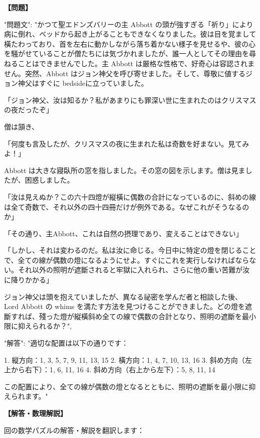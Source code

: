 \documentclass[10pt,a4paper,oneside,openany]{ltjsbook}
\begin{document}
\begin{tcolorbox}[colback=softblue,colframe=primaryblue,title=\textbf{第 292 問：THE ABBOT'S WINDOW.},arc=2mm,boxrule=1pt,breakable]
\textbf{【問題】}\par\vspace{0.3em}
{
  "問題文": "かつて聖エドンズバリーの主 Abbott の頭が強すぎる「祈り」により病に倒れ、ベッドから起き上がることもできなくなりました。彼は目を覚まして橫たわっており、首を左右に動かしながら落ち着かない様子を見せるや、彼の心を騒がせていることが僧たちには気づかれましたが、誰一人としてその理由を尋ねることはできませんでした。主 Abbott は厳格な性格で、好奇心は容認されません。突然、Abbott はジョン神父を呼び寄せました。そして、尊敬に値するジョン神父はすぐに bedsideに立っていました。

「ジョン神父、汝は知るか？私があまりにも罪深い世に生まれたのはクリスマスの夜だったぞ」

僧は頷き、

「何度も言及したが、クリスマスの夜に生まれた私は奇数を好まない。見てみよ！」

Abbott は大きな寢臥所の窓を指しました。その窓の図を示します。僧は見ましたが、困惑しました。

「汝は見えぬか？この六十四燈が縦橫に偶数の合計になっているのに、斜めの線は全て奇数で、それ以外の四十四冊だけが例外である。なぜこれがそうなるのか」

「その通り、主Abbott、これは自然の摂理であり、変えることはできない」

「しかし、それは変わるのだ。私は汝に命じる。今日中に特定の燈を閉じることで、全ての線が偶数の燈になるようにせよ。すぐにこれを実行しなければならない。それ以外の照明が遮斷されると牢獄に入れられ、さらに他の重い苦難が汝に降りかかる」

ジョン神父は頭を抱えていましたが、異なる祕密を学んだ者と相談した後、Lord Abbott の whims を満たす方法を見つけることができました。どの燈を遮斷すれば、殘った燈が縦橫斜め全ての線で偶数の合計となり、照明の遮斷を最小限に抑えられるか？",

  "解答": "適切な配置は以下の通りです：

1. 縦方向：1, 3, 5, 7, 9, 11, 13, 15
2. 橫方向：1, 4, 7, 10, 13, 16
3. 斜め方向（左上から右下）：1, 6, 11, 16
4. 斜め方向（右上から左下）：5, 8, 11, 14

この配置により、全ての線が偶数の燈となるとともに、照明の遮斷を最小限に抑えられます。"
}
\tcblower
\textbf{【解答・数理解説】}\par\vspace{0.3em}
回の数学パズルの解答・解説を翻訳します：


\end{tcolorbox}
\end{document}
